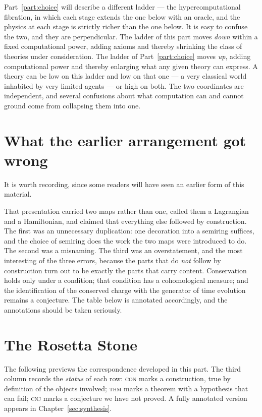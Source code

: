\begin{remark}
\label{rmk:two-ladders}
Part~\ref{part:choice} will describe a different ladder --- the
hypercomputational fibration, in which each stage extends the one below
with an oracle, and the physics at each stage is strictly richer than the
one below.
It is easy to confuse the two, and they are perpendicular.
The ladder of this part moves \emph{down} within a fixed computational
power, adding axioms and thereby shrinking the class of theories under
consideration.
The ladder of Part~\ref{part:choice} moves \emph{up}, adding computational
power and thereby enlarging what any given theory can express.
A theory can be low on this ladder and low on that one --- a very
classical world inhabited by very limited agents --- or high on both.
The two coordinates are independent, and several confusions about what
computation can and cannot ground come from collapsing them into one.
\end{remark}

\section{What the earlier arrangement got wrong}

It is worth recording, since some readers will have seen an earlier form
of this material.

That presentation carried two maps rather than one, called them a
Lagrangian and a Hamiltonian, and claimed that everything else followed
by construction.
The first was an unnecessary duplication: one decoration into a semiring
suffices, and the choice of semiring does the work the two maps were
introduced to do.
The second was a misnaming.
The third was an overstatement, and the most interesting of the three
errors, because the parts that do \emph{not} follow by construction turn
out to be exactly the parts that carry content.
Conservation holds only under a condition; that condition has a
cohomological measure; and the identification of the conserved charge
with the generator of time evolution remains a conjecture.
The table below is annotated accordingly, and the annotations should be
taken seriously.

\section{The Rosetta Stone}
\label{sec:rosetta}

The following previews the correspondence developed in this part.
The third column records the \emph{status} of each row:
\textsc{con} marks a construction, true by definition of the objects
involved; \textsc{thm} marks a theorem with a hypothesis that can fail;
\textsc{cnj} marks a conjecture we have not proved.
A fully annotated version appears in Chapter~\ref{sec:synthesis}.

